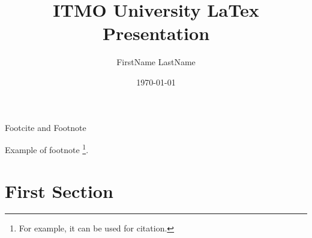 \documentclass[aspectratio=169]{beamer}
\title[ITMO LaTex]{ITMO University LaTex Presentation}
\author[LastName F.]{FirstName LastName}
\date{\today}
\begin{document}


\begin{frame}[plain]
    \titlepage
\end{frame}



\begin{frame}[plain]
\end{frame}





\begin{frame}{Footcite and Footnote}

Example of footnote \footnote{For example, it can be used for citation.}.

\end{frame}



\section{First Section}
\end{document}
